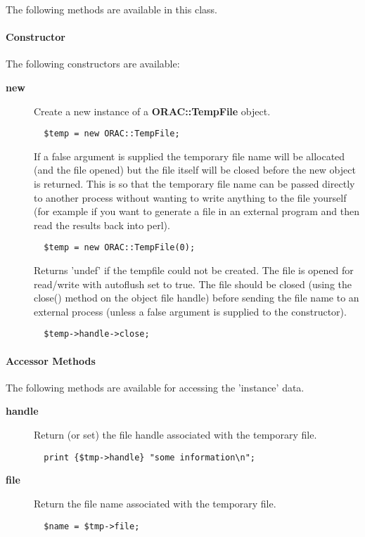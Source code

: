 The following methods are available in this class.

\paragraph*{Constructor\label{ORAC::TempFile_Constructor}}

The following constructors are available:

\begin{description}
\item[\textbf{new}] \mbox{}

Create a new instance of a \textbf{ORAC::TempFile} object.

\begin{verbatim}
  $temp = new ORAC::TempFile;
\end{verbatim}


If a false argument is supplied the temporary file
name will be allocated (and the file opened) but the 
file itself will be closed before the new object is returned.
This is so that the temporary file name can be passed directly
to another process without wanting to write anything to the
file yourself (for example if you want to generate a file
in an external program and then read the results back into
perl).

\begin{verbatim}
  $temp = new ORAC::TempFile(0);
\end{verbatim}


Returns 'undef' if the tempfile could not be created.
The file is opened for read/write with autoflush set to true.
The file should be closed (using the close() method on the
object file handle) before sending the file name to an external
process (unless a false argument is supplied to the constructor).

\begin{verbatim}
  $temp->handle->close;
\end{verbatim}
\end{description}
\paragraph*{Accessor Methods\label{ORAC::TempFile_Accessor_Methods}}

The following methods are available for accessing the 
'instance' data.

\begin{description}
\item[\textbf{handle}] \mbox{}

Return (or set) the file handle associated with the temporary 
file.

\begin{verbatim}
  print {$tmp->handle} "some information\n";
\end{verbatim}
\item[\textbf{file}] \mbox{}

Return the file name associated with the temporary file.

\begin{verbatim}
  $name = $tmp->file;
\end{verbatim}
\end{description}
